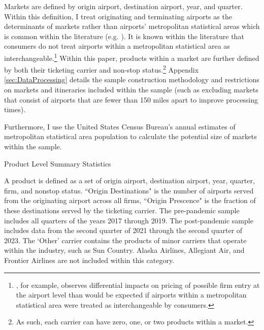 \documentclass{article}
\begin{document}
	Markets are defined by origin airport, destination airport, year, and quarter. Within this definition, I treat originating and terminating airports as the determinants of markets rather than airports' metropolitan statistical areas which is common within the literature (e.g. \citet{ciliberto_does_2014, luo_price_2014, tan_incumbent_2016,ciliberto_market_2021}). It is known within the literature that consumers do not treat airports within a metropolitan statistical area as interchangeable.\footnote{\citet{goolsbee_how_2008}, for example, observes differential impacts on pricing of possible firm entry at the airport level than would be expected if airports within a metropolitan statistical area were treated as interchangeable by consumers.} Within this paper, products within a market are further defined by both their ticketing carrier and non-stop status.\footnote{As such, each carrier can have zero, one, or two products within a market.} Appendix \ref{sec:DataProcessing} details the sample construction methodology and restrictions on markets and itineraries included within the sample (such as excluding markets that consist of airports that are fewer than 150 miles apart to improve processing times).
	
	Furthermore, I use the United States Census Bureau's annual estimates of metropolitan statistical area population to calculate the potential size of markets within the sample. 
    
    \begin{table}
    \caption{Product Level Summary Statistics}
    \label{tab:Summary_Statistics_Product}
                    \vspace{-15mm}
                    \begin{center}
    
                        \end{center}
                    \vspace{-5mm}
    \footnotesize{A product is defined as a set of origin airport, destination airport, year, quarter, firm, and nonstop status. ``Origin Destinations" is the number of airports served from the originating airport across all firms, ``Origin Prescence" is the fraction of these destinations served by the ticketing carrier. The pre-pandemic sample includes all quarters of the years 2017 through 2019. The post-pandemic sample includes data from the second quarter of 2021 through the second quarter of 2023. The `Other' carrier contains the products of minor carriers that operate within the industry, such as Sun Country. Alaska Airlines, Allegiant Air, and Frontier Airlines are not included within this category.}
    \end{table}
\end{document}
